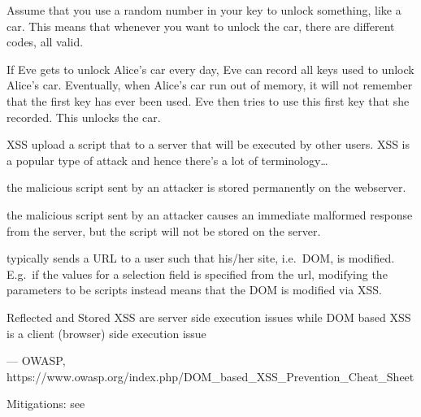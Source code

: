 \begin{definition}
	Assume that you use a random number in your key to unlock something, 
	like a car. This means that whenever you want to unlock the car, there
	are different codes, all valid. 
	
	If Eve gets to unlock Alice's car every day, Eve can record all keys used
	to unlock Alice's car. Eventually, when Alice's car run out of memory,
	it will not remember that the first key has ever been used. Eve
	then tries to use this first key that she recorded. This unlocks the car.
\end{definition}

\begin{definition}[Virus]
\end{definition}

\begin{definition}{XSS}
	upload a script that to a server that will be executed by other users.
	XSS is a popular type of attack and hence there's a lot of 
	terminology\dots
	\begin{description}[labelindent=1cm]
		\item[Stored XSS] the malicious script sent by an attacker is stored
			permanently on the webserver.
		\item[Reflected XSS] the malicious script sent by an attacker 
			causes an immediate malformed response from the server, but
			the script will not be stored on the server.
		\item[DOM-based XSS] typically sends a URL to a user such 
			that his/her site, i.e.\ DOM, is modified. E.g.\
			if the values for a selection field is specified from the url,
			modifying the parameters to be scripts instead
			means that the DOM is modified via XSS.
	\end{description}
	\epigraph{Reflected and Stored XSS are server side
	execution issues while DOM based XSS is a client (browser) side 
	execution issue}{--- \textup{OWASP}, https://www.owasp.org/index.php/DOM\_based\_XSS\_Prevention\_Cheat\_Sheet}
	

	Mitigations: see~
\end{definition}
